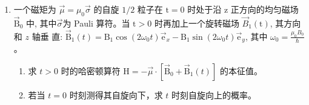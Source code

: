 \begin{enumerate}
{\begin{enumerate}
		\item 以这三个本征矢为列，得到从 $L_x$ 表象到 $L_z$ 表象的幺正矩阵
		\[
			\boxed{S=\begin{pmatrix}
			\frac12&\frac1{\sqrt2}&\frac12\\
			\frac1{\sqrt2}&0&-\frac1{\sqrt2}\\
			\frac12&-\frac1{\sqrt2}&\frac12
			\end{pmatrix}},\qquad S^\dagger S=I.
		\]

		\item 在 $L_x$ 表象中 $O_x=S^\dagger O_zS$，从而
		\[
			\boxed{L_x=\hbar\begin{pmatrix}1&0&0\\0&0&0\\0&0&-1\end{pmatrix}},
		\]
		\[
			\boxed{L_y=\frac{\hbar}{\sqrt2}
			\begin{pmatrix}0&i&0\\-i&0&i\\0&-i&0\end{pmatrix}},
			\qquad
			\boxed{L_z=\frac{\hbar}{\sqrt2}
			\begin{pmatrix}0&1&0\\1&0&1\\0&1&0\end{pmatrix}}.
		\]
	\end{enumerate}
}

\item 
一个磁矩为 $\vec{\mu}=\mu_{0} \vec{\sigma}$ 的自旋 $1 / 2$ 粒子在 $\mathrm{t}=0$ 时处于沿 $\mathrm{z}$ 正方向的均匀磁场 $\overrightarrow{\mathrm{B}}_{0}$
中, 其中$ \overrightarrow{\sigma} $为 Pauli 算符。当 $\mathrm{t}>0$ 时再加上一个旋转磁场 $\vec{B}_{1}(\mathrm{t})$, 其方向和 $z$ 轴垂	
直: $\overrightarrow{\mathrm{B}}_{1}(t)=\mathrm{B}_{1} \cos \left(2 \omega_{0} t \right) \overrightarrow{\mathrm{e}}_{x}-\mathrm{B}_{1} \sin \left(2 \omega_{0} t\right) \overrightarrow{\mathrm{e}}_{y}$, 其中 $\omega_{0}=\frac{\mu_{0} B_{0}}{\hbar}$ 。
\begin{enumerate}
	\item
	求 $t>0$ 时的哈密顿算符 $\mathrm{H}=-\vec{\mu} \cdot\left[\overrightarrow{\mathrm{B}}_{0}+\overrightarrow{\mathrm{B}}_{1}({t})\right]$ 的本征值。 
	\item 
	若当 $t=0$ 时刻测得其自旋向下，求 $t$ 时刻自旋向上的概率。
	

\end{enumerate}
\end{enumerate}
